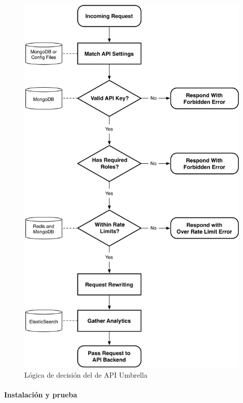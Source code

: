 \begin{figure}
  \includegraphics[width=\linewidth]{src/images/03-capitulo-3/tecnologias/api-umbrella/api-umbrella-gatekeeper.png}
  \caption{Lógica de decisión del  de API Umbrella}
  \label{fig:api-umbrella-gatekeeper}
\end{figure}

\paragraph{Instalación y prueba}

